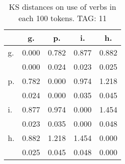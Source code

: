 \begin{table}[h!]
\begin{center}
\begin{tabular}{| l | c | c | c | c |}\hline
 & g. & p. & i. & h. \\\hline
g. & 0.000  & 0.782  & 0.877  & 0.882 \\\hline
 & 0.000  & 0.024  & 0.023  & 0.025 \\\hline
p. & 0.782  & 0.000  & 0.974  & 1.218 \\\hline
 & 0.024  & 0.000  & 0.035  & 0.045 \\\hline
i. & 0.877  & 0.974  & 0.000  & 1.454 \\\hline
 & 0.023  & 0.035  & 0.000  & 0.048 \\\hline
h. & 0.882  & 1.218  & 1.454  & 0.000 \\\hline
 & 0.025  & 0.045  & 0.048  & 0.000 \\\hline
\end{tabular}
\caption{KS distances on use of verbs in each 100 tokens. TAG: 11}
\end{center}
\end{table}